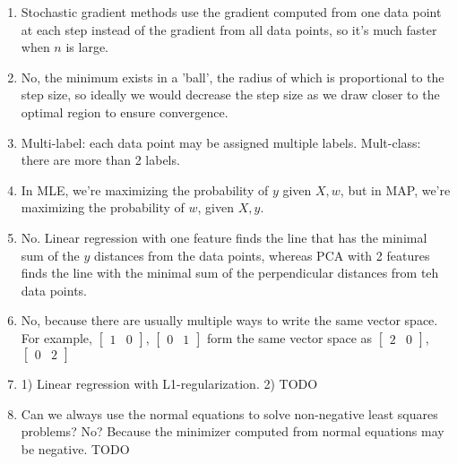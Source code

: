 \documentclass{article}
\def\enum#1{\begin{enumerate}#1\end{enumerate}}
\begin{document}
\enum{
\item Stochastic gradient methods use the gradient computed from one data point at each step instead of the gradient from all data points, so it's much faster when $n$ is large.
\item No, the minimum exists in a 'ball', the radius of which is proportional to the step size, so ideally we would decrease the step size as we draw closer to the optimal region to ensure convergence.
\item Multi-label: each data point may be assigned multiple labels. Mult-class: there are more than 2 labels.
\item In MLE, we're maximizing the probability of $y$ given $X, w$, but in MAP, we're maximizing the probability of $w$, given $X, y$.
\item No. Linear regression with one feature finds the line that has the minimal sum of the $y$ distances from the data points, whereas PCA with 2 features finds the line with the minimal sum of the perpendicular distances from teh data points.
\item No, because there are usually multiple ways to write the same vector space. For example, $\begin{bmatrix}1 & 0\end{bmatrix}$, $\begin{bmatrix}0 & 1\end{bmatrix}$ form the same vector space as $\begin{bmatrix}2 & 0\end{bmatrix}$, $\begin{bmatrix}0 & 2\end{bmatrix}$
\item 1) Linear regression with L1-regularization. 2) TODO
\item Can we always use the normal equations to solve non-negative least squares problems? No? Because the minimizer computed from normal equations may be negative. TODO
}
\end{document}

